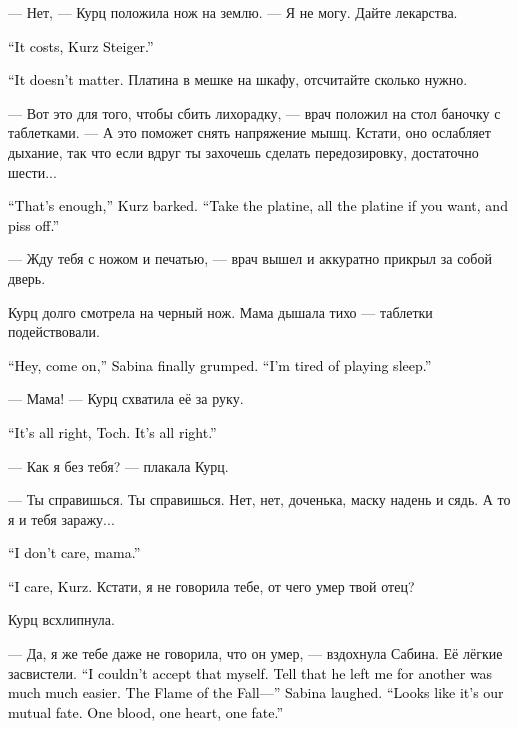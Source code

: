 \documentclass[a4paper,12pt,fleqn]{book}\usepackage{cooltooltips}\usepackage{polyglossia}\setdefaultlanguage[babelshorthands=true]{russian}\setotherlanguage{english}\defaultfontfeatures{Ligatures=TeX,Mapping=tex-text} \usepackage{xcolor}\definecolor{lightgray}{HTML}{bbbbbb}\color{lightgray}\newcommand{\ml}[3]{\textenglish{\textcolor{black}{#3}}}
\begin{document}
--- Нет, --- Курц положила нож на землю.
--- Я не могу.
Дайте лекарства.

\ml{$0$}
{--- Это не бесплатно, Курц Штайгер.}
{``It costs, Kurz Steiger.''}

\ml{$0$}
{--- Мне всё равно.}
{``It doesn't matter.}
Платина в мешке на шкафу, отсчитайте сколько нужно.

--- Вот это для того, чтобы сбить лихорадку, --- врач положил на стол баночку с таблетками.
--- А это поможет снять напряжение мышц.
Кстати, оно ослабляет дыхание, так что если вдруг ты захочешь сделать передозировку, достаточно шести...

\ml{$0$}
{--- Хватит, --- рявкнула Курц.}
{``That's enough,'' Kurz barked.}
\ml{$0$}
{--- Забирай платину, хоть всю, только проваливай.}
{``Take the platine, all the platine if you want, and piss off.''}

--- Жду тебя с ножом и печатью, --- врач вышел и аккуратно прикрыл за собой дверь.

Курц долго смотрела на черный нож.
Мама дышала тихо --- таблетки подействовали.

\ml{$0$}
{--- Давай уже, --- наконец проворчала Сабина.}
{``Hey, come on,'' Sabina finally grumped.}
\ml{$0$}
{--- Надоело притворяться спящей.}
{``I'm tired of playing sleep.''}

--- Мама! --- Курц схватила её за руку.

\ml{$0$}
{--- Всё хорошо, дочка.}
{``It's all right, Toch.}
\ml{$0$}
{Всё хорошо.}
{It's all right.''}

--- Как я без тебя? --- плакала Курц.

--- Ты справишься.
Ты справишься.
Нет, нет, доченька, маску надень и сядь.
А то я и тебя заражу...

\ml{$0$}
{--- Мне всё равно, мама.}
{``I don't care, mama.''}

\ml{$0$}
{--- Мне не всё равно, Курц.}
{``I care, Kurz.}
Кстати, я не говорила тебе, от чего умер твой отец?

Курц всхлипнула.

--- Да, я же тебе даже не говорила, что он умер, --- вздохнула Сабина.
Её лёгкие засвистели.
\ml{$0$}
{--- Я сама не могла с этим смириться.}
{``I couldn't accept that myself.}
\ml{$0$}
{Проще было сказать, что он ушёл к другой.}
{Tell that he left me for another was much much easier.}
\ml{$0$}
{Пламя Осени... --- Сабина усмехнулась.}
{The Flame of the Fall---'' Sabina laughed.}
\ml{$0$}
{--- Видать, судьба у нас с ним такая.}
{``Looks like it's our mutual fate.}
\ml{$0$}
{Одна кровь, одно сердце, одна судьба.}
{One blood, one heart, one fate.''}
\end{document}
